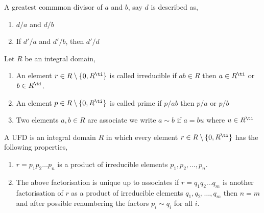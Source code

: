 \documentclass{article}
\begin{document}
\begin{ndefi}
  A greatest commmon divisor of $a$ and $b$, say $d$ is described as,
  \begin{enumerate}
    \item $d/a$ and $d/b$
    \item If $d'/a$ and $d'/b$, then $d'/d$
  \end{enumerate}
\end{ndefi}

\begin{ndefi}
  Let $R$ be an integral domain,
  \begin{enumerate}
    \item An element $r \in R \setminus \{0, R^\ti\}$ is called irreducible if $ab \in R$ then $a \in R^\ti$ or $b \in R^\ti$.
    \item An element $p \in R\setminus\{0, R^\ti\}$ is called prime if $p/ab$ then $p/a$ or $p/b$
    \item Two elements $a, b \in R$ are associate we write $a \sim b$ if $a = bu$ where $u \in R^\ti$
  \end{enumerate}
\end{ndefi}

\begin{ndefi}
  A UFD is an integral domain $R$ in which every element $r \in R\setminus \{0, R^\ti\}$ has the following properties,
  \begin{enumerate}
    \item $r = p_1p_2\dots p_n$ is a product of irreducible elements $p_1, p_2, \dots, p_n$.
    \item The above factorisation is unique up to associates if $r = q_1q_2 \dots q_m$ is another factorisation of $r$ as a product of irreducible elements $q_1, q_2, \dots, q_m$ then $n = m$ and after possible renumbering the factors $p_i \sim q_i$ for all $i$.
  \end{enumerate}
\end{ndefi}
\end{document}
